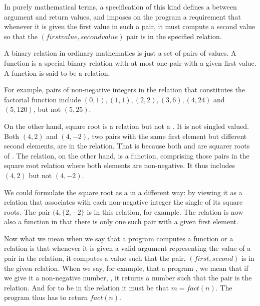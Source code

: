 \documentclass[letterpaper,10pt,english]{sphinxmanual}
\begin{document}
In purely mathematical terms, a specification of this kind defines a
 between argument and return values, and imposes on
the program a requirement that whenever it is given the first value in
such a pair, it must compute a second value so that the \((first
value, second value)\) pair is in the specified relation.

A binary relation in ordinary mathematics is just a set of pairs of
values. A function is a special binary relation with at most one pair
with a given first value. A function is said to be a 
relation.

For example, pairs of non-negative integers in the relation that
constitutes the factorial function include \((0,1), (1,1), (2,2),
(3,6), (4,24)\) and \((5,120)\), but not \((5,25)\).

On the other hand, square root is a relation but not a . It
is not singled valued. Both \((4,2)\) and \((4,-2)\), two
pairs with the same first element but different second elements, are
in the relation. That is because both  and  are squarer roots
of .  The  relation, on the other hand, is a
function, comprising those pairs in the square root relation where
both elements are non-negative. It thus includes \((4,2)\) but
not  \((4,-2)\).

We could formulate the square root  as a  in a
different way: by viewing it as a relation that associates with each
non-negative integer the single  of its square roots. The pair
\((4, \{2, -2\}\) is in this relation, for example. The relation is
now also a function in that there is only one such pair with a given
first element.

Now what we mean when we say that a program computes a function or a
relation is that whenever it is given a valid argument representing
the  value of a pair in the relation, it computes a 
value such that the pair, \((first, second)\) is in the given
relation. When we say, for example, that a program , we mean that if we give it a non-negative number,
, it returns a number  such that the pair  is  the
relation. And for  to be in the relation it must be that
\(m = fact(n)\). The program thus has to return \(fact(n)\).
\end{document}
